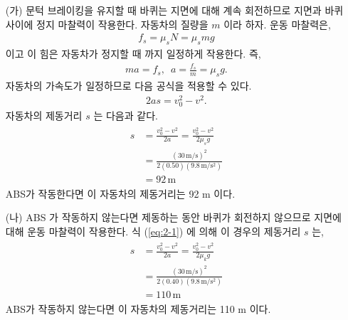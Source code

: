 \documentclass[floatfix,nofootinbib,superscriptaddress,fleqn,preprint]{revtex4}
\begin{document}
\begin{itemize}
  \item[(가)] 문턱 브레이킹을 유지할 때 바퀴는 지면에 대해 계속 회전하므로 지면과 
  바퀴 사이에 정지 마찰력이 작용한다. 자동차의 질량을 $m$ 이라 하자. 운동 마찰력은,
  \begin{align}
    f_s = \mu_s N = \mu_s mg
  \end{align} 
이고 이 힘은 자동차가 정지할 때 까지 일정하게 작용한다. 즉,
\begin{align}
  ma = f_s,\,\,\, a = \frac{f_s}{m}=\mu_s g.
\end{align}
자동차의 가속도가 일정하므로 다음 공식을 적용할 수 있다.
\begin{align}
  2as = v^2_0-v^2.
\end{align}
자동차의 제동거리 $s$ 는 다음과 같다.
\begin{align}
  \begin{split}\label{eq:2-1}
    s &= \frac{v^2_0-v^2}{2a} = \frac{v^2_0-v^2}{2\mu_s g}  \\
    &= \frac{(30\,\mathrm{m/s})^2}{2(0.50)(9.8\,\mathrm{m/s^2})}  \\
    &= 92\,\mathrm{m}
  \end{split}
\end{align}
ABS가 작동한다면 이 자동차의 제동거리는 92 m 이다.
  \item[(나)] ABS 가 작동하지 않는다면 제동하는 동안 바퀴가 회전하지 않으므로 
  지면에 대해 운동 마찰력이 작용한다. 식 (\ref{eq:2-1}) 에 의해 이 경우의 
  제동거리 $s$ 는,
  \begin{align}
    \begin{split}
      s &= \frac{v^2_0-v^2}{2a} = \frac{v^2_0-v^2}{2\mu_k g}  \\
      &= \frac{(30\,\mathrm{m/s})^2}{2(0.40)(9.8\,\mathrm{m/s^2})}  \\
      &= 110\,\mathrm{m}
    \end{split}
  \end{align}
  ABS가 작동하지 않는다면 이 자동차의 제동거리는 110 m 이다.
\end{itemize}

\vspace{1.cm}
\end{document}
